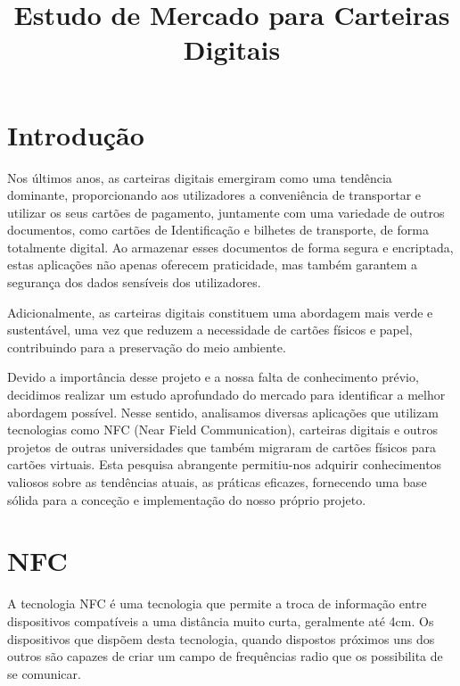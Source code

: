 \documentclass{article}
\begin{document}
\title{Estudo de Mercado para Carteiras Digitais}
\maketitle

\section{Introdução}

Nos últimos anos, as carteiras digitais emergiram como uma tendência dominante, proporcionando aos utilizadores a conveniência de transportar e utilizar os seus cartões de pagamento, juntamente com uma variedade de outros documentos, como cartões de Identificação e bilhetes de transporte, de forma totalmente digital. Ao armazenar esses documentos de forma segura e encriptada, estas aplicações não apenas oferecem praticidade, mas também garantem a segurança dos dados sensíveis dos utilizadores.

\indent Adicionalmente, as carteiras digitais constituem uma abordagem mais verde e sustentável, uma vez que reduzem a necessidade de cartões físicos e papel, contribuindo para a preservação do meio ambiente.

Devido a importância desse projeto e a nossa falta de conhecimento prévio, decidimos realizar um estudo aprofundado do mercado para identificar a melhor abordagem possível. Nesse sentido, analisamos diversas aplicações que utilizam tecnologias como NFC (Near Field Communication), carteiras digitais e outros projetos de outras universidades que também migraram de cartões físicos para cartões virtuais. Esta pesquisa abrangente permitiu-nos adquirir conhecimentos valiosos sobre as tendências atuais, as práticas eficazes, fornecendo uma base sólida para a conceção e implementação do nosso próprio projeto.

\section{NFC}

A tecnologia NFC é uma tecnologia que permite a troca de informação entre dispositivos compatíveis a uma distância muito curta, geralmente até 4cm. Os dispositivos que dispõem desta tecnologia, quando dispostos próximos uns dos outros são capazes de criar um campo de frequências radio que os possibilita de se comunicar.
\end{document}
